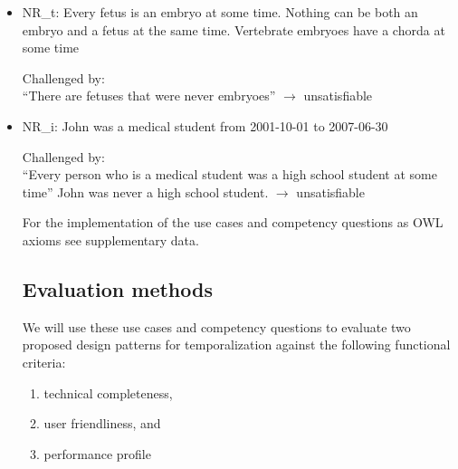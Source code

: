 \begin{itemize}


\item NR\_t: Every fetus is an embryo at some time. Nothing can be both an embryo and a fetus at the same time. Vertebrate embryoes have a chorda at some time

Challenged by: \\ ``There are fetuses that were never embryoes''  $\rightarrow$ unsatisfiable




\item NR\_i: John was a medical student from 2001-10-01 to 2007-06-30

Challenged by: \\ ``Every person who is a medical student was a high school student at some time''   
John was never a high school student. $\rightarrow$ unsatisfiable

For the implementation of the use cases and competency questions as OWL axioms see supplementary data.
 
%
%
%
%

\subsection*{Evaluation methods}
We will use these use cases and competency questions to evaluate two proposed design patterns for temporalization against the following functional criteria:
\begin{enumerate}
    \item technical completeness, 
    \item user friendliness, and
    \item performance profile
\end{enumerate}


\end{itemize}